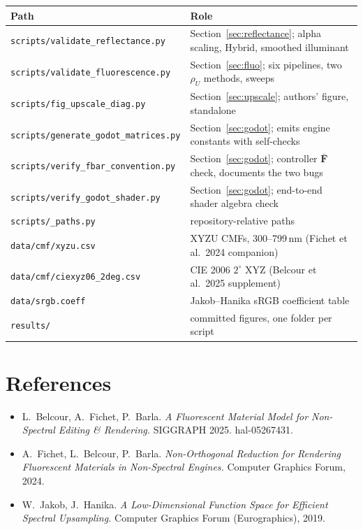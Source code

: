 \documentclass[11pt,a4paper]{article}
\newcommand{\mFb}{\bar{\mathbf{F}}}
\newcommand{\file}[1]{\texttt{#1}}
\begin{document}
\begin{table}[h]\centering\small
\begin{tabular}{@{}lp{9.2cm}@{}}
\toprule
Path & Role \\
\midrule
\file{scripts/validate\_reflectance.py}   & Section~\ref{sec:reflectance}; alpha scaling, Hybrid, smoothed illuminant \\
\file{scripts/validate\_fluorescence.py}  & Section~\ref{sec:fluo}; six pipelines, two $\rho_U$ methods, sweeps \\
\file{scripts/fig\_upscale\_diag.py}      & Section~\ref{sec:upscale}; authors' figure, standalone \\
\file{scripts/generate\_godot\_matrices.py} & Section~\ref{sec:godot}; emits engine constants with self-checks \\
\file{scripts/verify\_fbar\_convention.py} & Section~\ref{sec:godot}; controller $\mFb$ check, documents the two bugs \\
\file{scripts/verify\_godot\_shader.py}   & Section~\ref{sec:godot}; end-to-end shader algebra check \\
\file{scripts/\_paths.py}                 & repository-relative paths \\
\file{data/cmf/xyzu.csv}                  & XYZU CMFs, 300--799\,nm (Fichet et al.\ 2024 companion) \\
\file{data/cmf/ciexyz06\_2deg.csv}        & CIE 2006 $2^\circ$ XYZ (Belcour et al.\ 2025 supplement) \\
\file{data/srgb.coeff}                    & Jakob--Hanika sRGB coefficient table \\
\file{results/}                           & committed figures, one folder per script \\
\bottomrule
\end{tabular}
\end{table}

\section*{References}
\begin{itemize}[nosep]
  \item L.~Belcour, A.~Fichet, P.~Barla. \emph{A Fluorescent Material Model for
        Non-Spectral Editing \& Rendering.} SIGGRAPH 2025. hal-05267431.
  \item A.~Fichet, L.~Belcour, P.~Barla. \emph{Non-Orthogonal Reduction for
        Rendering Fluorescent Materials in Non-Spectral Engines.} Computer
        Graphics Forum, 2024.
  \item W.~Jakob, J.~Hanika. \emph{A Low-Dimensional Function Space for Efficient
        Spectral Upsampling.} Computer Graphics Forum (Eurographics), 2019.
\end{itemize}
\end{document}
